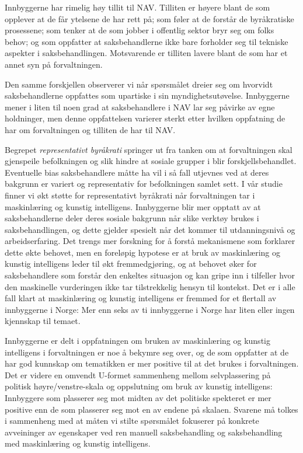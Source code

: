 \documentclass[
]{book}
\begin{document}
Innbyggerne har rimelig høy tillit til NAV.
Tilliten er høyere blant de som opplever at de får ytelsene de har rett på; som føler at de forstår de byråkratiske prosessene; som tenker at de som jobber i offentlig sektor bryr seg om folks behov; og som oppfatter at saksbehandlerne ikke bare forholder seg til tekniske aspekter i saksbehandlingen.
Motsvarende er tilliten lavere blant de som har et annet syn på forvaltningen.

Den samme forskjellen observerer vi når spørsmålet dreier seg om hvorvidt saksbehandlerne oppfattes som upartiske i sin myndighetsutøvelse.
Innbyggerne mener i liten til noen grad at saksbehandlere i NAV lar seg påvirke av egne holdninger, men denne oppfattelsen varierer sterkt etter hvilken oppfatning de har om forvaltningen og tilliten de har til NAV.

Begrepet \emph{representativt byråkrati} springer ut fra tanken om at forvaltningen skal gjenspeile befolkningen og slik hindre at sosiale grupper i blir forskjellsbehandlet.
Eventuelle bias saksbehandlere måtte ha vil i så fall utjevnes ved at deres bakgrunn er variert og representativ for befolkningen samlet sett.
I vår studie finner vi økt støtte for representativt byråkrati når forvaltningen tar i maskinlæring og kunstig intelligens.
Innbyggerne blir mer opptatt av at saksbehandlerne deler deres sosiale bakgrunn når slike verktøy brukes i saksbehandlingen, og dette gjelder spesielt når det kommer til utdanningsnivå og arbeidserfaring.
Det trengs mer forskning for å forstå mekanismene som forklarer dette økte behovet, men en foreløpig hypotese er at bruk av maskinlæring og kunstig intelligens leder til økt fremmedgjøring, og at behovet øker for saksbehandlere som forstår den enkeltes situasjon og kan gripe inn i tilfeller hvor den maskinelle vurderingen ikke tar tilstrekkelig hensyn til kontekst.
Det er i alle fall klart at maskinlæring og kunstig intelligens er fremmed for et flertall av innbyggerne i Norge:
Mer enn seks av ti innbyggerne i Norge har liten eller ingen kjennskap til temaet.

Innbyggerne er delt i oppfatningen om bruken av maskinlæring og kunstig intelligens i forvaltningen er noe å bekymre seg over, og de som oppfatter at de har god kunnskap om tematikken er mer positive til at det brukes i forvaltningen.
Det er videre en omvendt U-formet sammenheng mellom selvplassering på politisk høyre/venstre-skala og oppslutning om bruk av kunstig intelligens:
Innbyggere som plasserer seg mot midten av det politiske spekteret er mer positive enn de som plasserer seg mot en av endene på skalaen.
Svarene må tolkes i sammenheng med at måten vi stilte spørsmålet fokuserer på konkrete avveininger av egenskaper ved ren manuell saksbehandling og saksbehandling med maskinlæring og kunstig intelligens.
\end{document}
